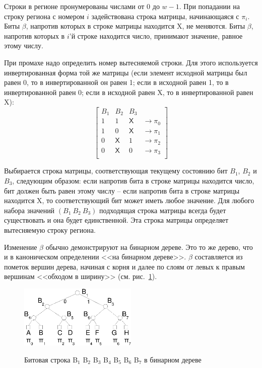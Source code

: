 Строки в регионе пронумерованы числами от 0 до $w{-}1$. При попадании на строку
региона с номером $i$ задействована строка матрицы, начинающаяся с $\pi_i$. Биты
$\beta$, напротив которых в строке матрицы находится \textsf{X}, не меняются.
Биты $\beta$, напротив которых в $i$'й строке находится число, принимают
значение, равное этому числу.

При промахе надо определить номер вытесняемой строки. Для этого используется
инвертированная форма той же матрицы (если элемент исходной матрицы был равен 0, то в инвертированной он равен 1; если в исходной равен 1, то в инвертированной равен 0; если в исходной равен \textsf{X}, то в инвертированной равен \textsf{X}):
$$
\left[
  \begin{array}{ccc|c}
    B_1 & B_2 & B_3 & \\ \hline
    1 & 1 & \textsf{X} & \rightarrow \pi_0 \\
    1 & 0 & \textsf{X} & \rightarrow \pi_1 \\
    0 & \textsf{X} & 1 & \rightarrow \pi_2 \\
    0 & \textsf{X} & 0 & \rightarrow \pi_3 \\
  \end{array}
\right]
$$

Выбирается строка матрицы, соответствующая текущему состоянию бит $B_1$,
$B_2$ и $B_3$, следующим образом: если напротив бита в строке матрицы находится число, бит
должен быть равен этому числу -- если напротив бита в строке матрицы
находится \textsf{X}, то соответствующий бит может иметь любое значение. Для любого набора значений $(B_1~B_2~B_3)$ подходящая строка матрицы всегда будет существовать и она будет единственной. Эта строка матрицы определяет вытесняемую строку региона.

Изменение $\beta$ обычно демонстрируют на бинарном дереве. Это то же дерево, что и в каноническом определении \PseudoLRU <<на бинарном дереве>>. $\beta$ составляется из пометок вершин дерева, начиная с корня и далее по слоям от левых к правым вершинам <<обходом в ширину>> (см. рис.~\ref{plru_bittree}).

\begin{figure}[h] \center
  \includegraphics[width=0.5\textwidth]{2.theor/plru}\\
  \caption{Битовая строка B$_1$ B$_2$ B$_3$ B$_4$ B$_5$ B$_6$ B$_7$  в бинарном дереве}\label{plru_bittree}
\end{figure}

